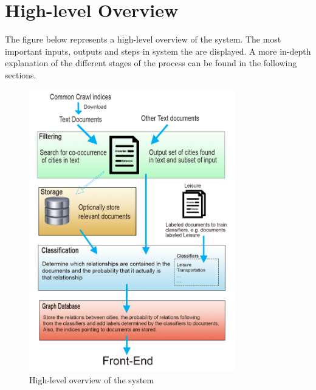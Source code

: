 \section{High-level Overview}
The figure below represents a high-level overview of the system. The most important inputs, outputs and steps in system the are displayed. A more in-depth explanation of the different stages of the process can be found in the following sections.

\begin{figure}[ht]
\centering
\includegraphics[width=0.8\textwidth]{System-overview-3}
\caption{High-level overview of the system}
\label{fig:overview}
\end{figure}